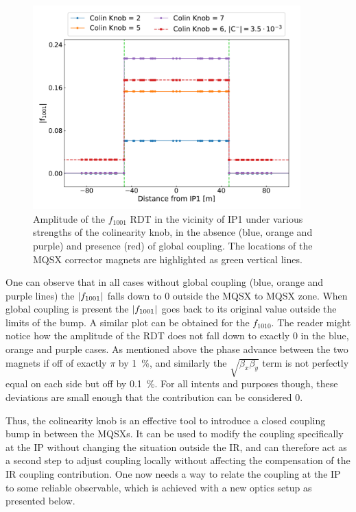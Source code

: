 \begin{figure}[!htb]
    \centering
    \includegraphics*[width=0.92\textwidth]{Figures/IR_Coupling_Correction/colinearity_knob_effect.pdf}
    \caption{Amplitude of the \(f_{1001}\) RDT in the vicinity of IP\num{1} under various strengths of the colinearity knob, in the absence (\textcolor{mplblue}{blue}, \textcolor{mplorange}{orange} and \textcolor{mplpurple}{purple}) and presence (\textcolor{mplred}{red}) of global coupling. The locations of the MQSX corrector magnets are highlighted as \textcolor{mqsx_green}{green} vertical lines.}
    \label{figure:colinearity_knob_effect}
\end{figure}

One can observe that in all cases without global coupling (\textcolor{mplblue}{blue}, \textcolor{mplorange}{orange} and \textcolor{mplpurple}{purple} lines) the \(\left\lvert f_{1001} \right\rvert\) falls down to \num{0} outside the MQSX to MQSX zone.
When global coupling is present the \(\left\lvert f_{1001} \right\rvert\) goes back to its original value outside the limits of the bump.
A similar plot can be obtained for the \(f_{1010}\).
The reader might notice how the amplitude of the RDT does not fall down to exactly \num{0} in the \textcolor{mplblue}{blue}, \textcolor{mplorange}{orange} and \textcolor{mplpurple}{purple} cases.
As mentioned above the phase advance between the two magnets if off of exactly \(\pi\) by \qty{1}{\percent}, and similarly the \(\sqrt{\beta_x \beta_y}\) term is not perfectly equal on each side but off by \qty{0.1}{\percent}.
For all intents and purposes though, these deviations are small enough that the contribution can be considered \num{0}.

Thus, the colinearity knob is an effective tool to introduce a closed coupling bump in between the MQSXs.
It can be used to modify the coupling specifically at the IP without changing the situation outside the IR, and can therefore act as a second step to adjust coupling locally without affecting the compensation of the IR coupling contribution.
One now needs a way to relate the coupling at the IP to some reliable observable, which is achieved with a new optics setup as presented below.

